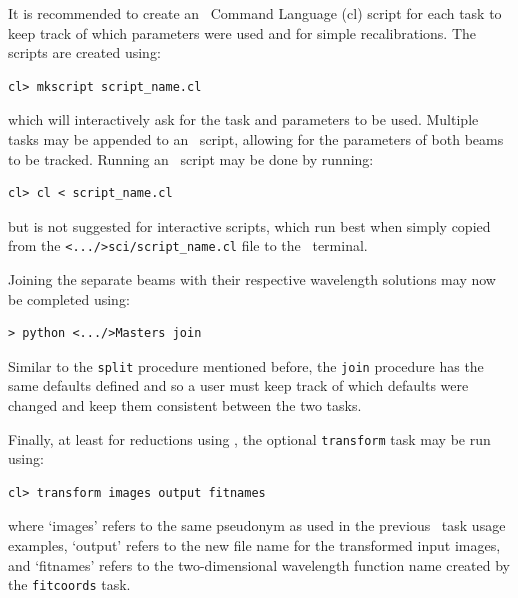 It is recommended to create an \iraf\ Command Language (cl) script for each task to keep track of which parameters were used and for simple recalibrations. The scripts are created using:

\begin{verbatim}cl> mkscript script_name.cl\end{verbatim}

\noindent which will interactively ask for the task and parameters to be used. Multiple tasks may be appended to an \iraf\ script, allowing for the parameters of both beams to be tracked. Running an \iraf\ script may be done by running:

\begin{verbatim}cl> cl < script_name.cl\end{verbatim}

\noindent but is not suggested for interactive scripts, which run best when simply copied from the \texttt{<.../>sci/script\_name.cl} file to the \iraf\ terminal.
\prgph

Joining the separate beams with their respective wavelength solutions may now be completed using:

\begin{verbatim}> python <.../>Masters join\end{verbatim}

Similar to the \texttt{split} procedure mentioned before, the \texttt{join} procedure has the same defaults defined and so a user must keep track of which defaults were changed and keep them consistent between the two tasks.
\prgph

\prgph

Finally, at least for reductions using \iraf, the optional \texttt{transform} task may be run using:

\begin{verbatim}cl> transform images output fitnames\end{verbatim}

\noindent where `images' refers to the same pseudonym as used in the previous \iraf\ task usage examples, `output' refers to the new file name for the transformed input images, and `fitnames' refers to the two-dimensional wavelength function name created by the \texttt{fitcoords} task.


